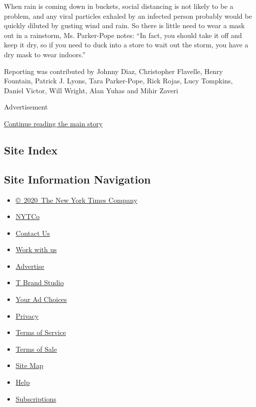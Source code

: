 When rain is coming down in buckets, social distancing is not likely to
be a problem, and any viral particles exhaled by an infected person
probably would be quickly diluted by gusting wind and rain. So there is
little need to wear a mask out in a rainstorm, Ms. Parker-Pope notes:
``In fact, you should take it off and keep it dry, so if you need to
duck into a store to wait out the storm, you have a dry mask to wear
indoors.''

Reporting was contributed by Johnny Diaz, Christopher Flavelle, Henry
Fountain, Patrick J. Lyons, Tara Parker-Pope, Rick Rojas, Lucy Tompkins,
Daniel Victor, Will Wright, Alan Yuhas and Mihir Zaveri

Advertisement

\protect\hyperlink{after-bottom}{Continue reading the main story}

\hypertarget{site-index}{%
\subsection{Site Index}\label{site-index}}

\hypertarget{site-information-navigation}{%
\subsection{Site Information
Navigation}\label{site-information-navigation}}

\begin{itemize}
\tightlist
\item
  \href{https://help.nytimes3xbfgragh.onion/hc/en-us/articles/115014792127-Copyright-notice}{©~2020~The
  New York Times Company}
\end{itemize}

\begin{itemize}
\tightlist
\item
  \href{https://www.nytco.com/}{NYTCo}
\item
  \href{https://help.nytimes3xbfgragh.onion/hc/en-us/articles/115015385887-Contact-Us}{Contact
  Us}
\item
  \href{https://www.nytco.com/careers/}{Work with us}
\item
  \href{https://nytmediakit.com/}{Advertise}
\item
  \href{http://www.tbrandstudio.com/}{T Brand Studio}
\item
  \href{https://www.nytimes3xbfgragh.onion/privacy/cookie-policy\#how-do-i-manage-trackers}{Your
  Ad Choices}
\item
  \href{https://www.nytimes3xbfgragh.onion/privacy}{Privacy}
\item
  \href{https://help.nytimes3xbfgragh.onion/hc/en-us/articles/115014893428-Terms-of-service}{Terms
  of Service}
\item
  \href{https://help.nytimes3xbfgragh.onion/hc/en-us/articles/115014893968-Terms-of-sale}{Terms
  of Sale}
\item
  \href{https://spiderbites.nytimes3xbfgragh.onion}{Site Map}
\item
  \href{https://help.nytimes3xbfgragh.onion/hc/en-us}{Help}
\item
  \href{https://www.nytimes3xbfgragh.onion/subscription?campaignId=37WXW}{Subscriptions}
\end{itemize}
